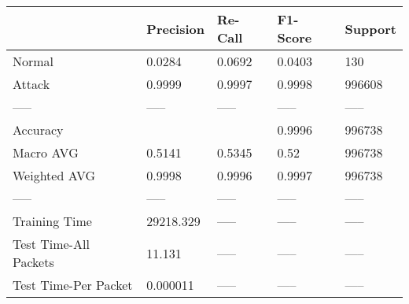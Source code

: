 \begin{tabular}{lllll}
\toprule
{} &  Precision & Re-Call & F1-Score & Support \\
\midrule
Normal                &     0.0284 &  0.0692 &   0.0403 &     130 \\
Attack                &     0.9999 &  0.9997 &   0.9998 &  996608 \\
-----                 &      ----- &   ----- &    ----- &   ----- \\
Accuracy              &            &         &   0.9996 &  996738 \\
Macro AVG             &     0.5141 &  0.5345 &     0.52 &  996738 \\
Weighted AVG          &     0.9998 &  0.9996 &   0.9997 &  996738 \\
-----                 &      ----- &   ----- &    ----- &   ----- \\
Training Time         &  29218.329 &   ----- &    ----- &   ----- \\
Test Time-All Packets &     11.131 &   ----- &    ----- &   ----- \\
Test Time-Per Packet  &   0.000011 &   ----- &    ----- &   ----- \\
\bottomrule
\end{tabular}
